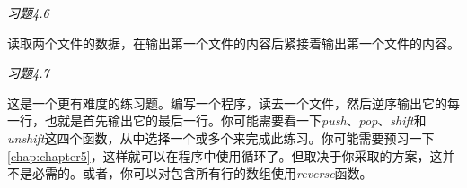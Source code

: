 \textcolor{black}{\textit{习题4.6}}
\begin{adjustwidth}{4em}{}
读取两个文件的数据，在输出第一个文件的内容后紧接着输出第一个文件的内容。
\end{adjustwidth}

\textcolor{black}{\textit{习题4.7}}
\begin{adjustwidth}{4em}{}
这是一个更有难度的练习题。编写一个程序，读去一个文件，然后逆序输出它的每一行，也就是首先输出它的最后一行。你可能需要看一下\textit{push}、\textit{pop}、\textit{shift}和\textit{unshift}这四个函数，从中选择一个或多个来完成此练习。你可能需要预习一下\autoref{chap:chapter5}，这样就可以在程序中使用循环了。但取决于你采取的方案，这并不是必需的。或者，你可以对包含所有行的数组使用\textit{reverse}函数。
\end{adjustwidth}

